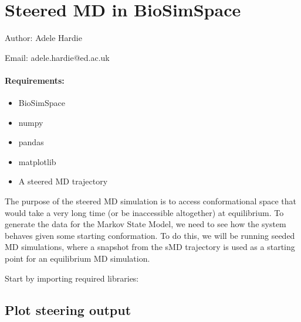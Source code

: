 \hypertarget{steered-md-in-biosimspace}{%
\section{Steered MD in BioSimSpace}\label{steered-md-in-biosimspace}}

Author: Adele Hardie

Email: adele.hardie@ed.ac.uk

\hypertarget{requirements}{%
\paragraph{Requirements:}\label{requirements}}

\begin{itemize}
\tightlist
\item
  BioSimSpace
\item
  numpy
\item
  pandas
\item
  matplotlib
\item
  A steered MD trajectory
\end{itemize}

The purpose of the steered MD simulation is to access conformational
space that would take a very long time (or be inaccessible altogether)
at equilibrium. To generate the data for the Markov State Model, we need
to see how the system behaves given some starting conformation. To do
this, we will be running seeded MD simulations, where a snapshot from
the sMD trajectory is used as a starting point for an equilibrium MD
simulation.

Start by importing required libraries:

\begin{Shaded}
\begin{Highlighting}[]
\end{Highlighting}
\end{Shaded}

\hypertarget{plot-steering-output}{%
\subsection{Plot steering output}\label{plot-steering-output}}

